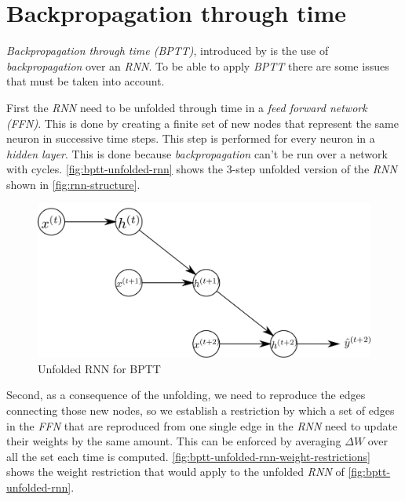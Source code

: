 \section{Backpropagation through time}
\label{sec:bp-through-time}

\textit{Backpropagation through time (BPTT)}, introduced by
\cite{werbos1990backpropagation} is the use of
\textit{backpropagation} over an \textit{RNN}. To be able to apply
\textit{BPTT} there are some issues that must be taken into account.

First the \textit{RNN} need to be unfolded through time in a
\textit{feed forward network (FFN)}. This is done by creating a finite
set of new nodes that represent the same neuron in successive time
steps. This step is performed for every neuron in a \textit{hidden
layer}. This is done because \textit{backpropagation} can't be run
over a network with cycles. \autoref{fig:bptt-unfolded-rnn} shows the
3-step unfolded version of the \textit{RNN} shown in
\autoref{fig:rnn-structure}.

\begin{figure}[bth]
  \centering
  \includegraphics[width=.95\linewidth]{gfx/bptt-unfolded-rnn}
  \caption{Unfolded RNN for BPTT}
  \label{fig:bptt-unfolded-rnn}
\end{figure}

Second, as a consequence of the unfolding, we need to reproduce the
edges connecting those new nodes, so we establish a restriction by
which a set of edges in the \textit{FFN} that are reproduced from one
single edge in the \textit{RNN} need to update their weights by the
same amount. This can be enforced by averaging $\Delta W$ over all the
set each time is computed.
\autoref{fig:bptt-unfolded-rnn-weight-restrictions} shows the weight
restriction that would apply to the unfolded \textit{RNN} of
\autoref{fig:bptt-unfolded-rnn}.

